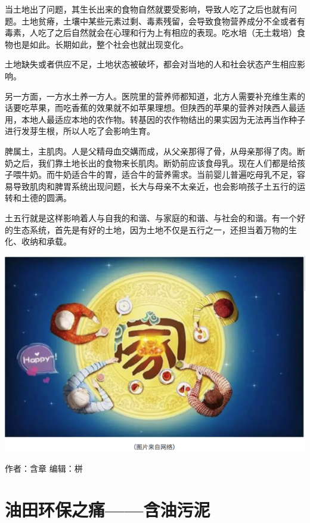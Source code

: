 \documentclass[]{book}
\begin{document}
当土地出了问题，其生长出来的食物自然就要受影响，导致人吃了之后也就有问题。土地贫瘠，土壤中某些元素过剩、毒素残留，会导致食物营养成分不全或者有毒素，人吃了之后自然就会在心理和行为上有相应的表现。吃水培（无土栽培）食物也是如此。长期如此，整个社会也就出现变化。

土地缺失或者供应不足，土地状态被破坏，都会对当地的人和社会状态产生相应影响。

另一方面，一方水土养一方人。医院里的营养师都知道，北方人需要补充维生素的话要吃苹果，而吃香蕉的效果就不如苹果理想。但陕西的苹果的营养对陕西人最适用，本地人最适应本地的农作物。转基因的农作物结出的果实因为无法再当作种子进行发芽生根，所以人吃了会影响生育。

脾属土，主肌肉。人是父精母血交媾而成，从父亲那得了骨，从母亲那得了肉。断奶之后，我们靠土地长出的食物来长肌肉。断奶前应该食母乳。现在人们都是给孩子喂牛奶。而牛奶适合牛的胃，适合牛的营养需求。当前婴儿普遍吃母乳不足，容易导致肌肉和脾胃系统出现问题，长大与母亲不太亲近，也会影响孩子土五行的运转和土德的圆满。

土五行就是这样影响着人与自我的和谐、与家庭的和谐、与社会的和谐。有一个好的生态系统，首先是有好的土地，因为土地不仅是五行之一，还担当着万物的生化、收纳和承载。

\includegraphics[width=8.33in]{images/swr4}

作者：含章
编辑：栟

\hypertarget{ux6cb9ux7530ux73afux4fddux4e4bux75dbux542bux6cb9ux6c61ux6ce5}{%
\section{油田环保之痛------含油污泥}\label{ux6cb9ux7530ux73afux4fddux4e4bux75dbux542bux6cb9ux6c61ux6ce5}}
\end{document}
